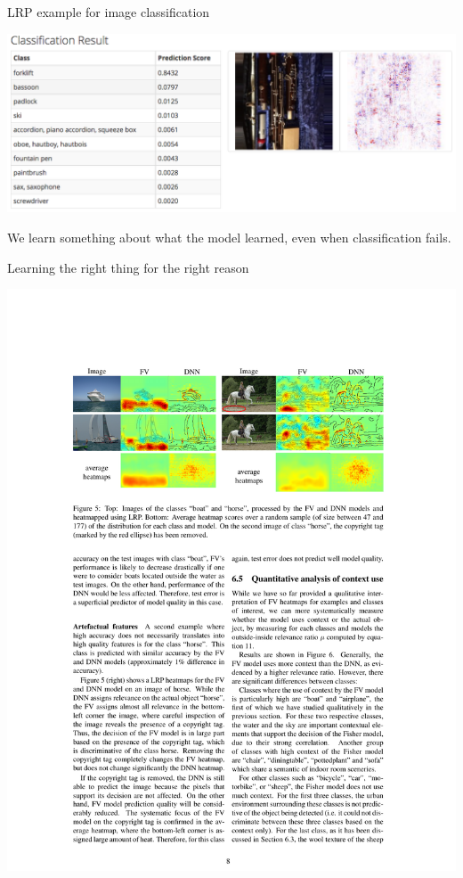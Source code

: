 \documentclass[compress]{beamer}
\begin{document}
\begin{frame}{LRP example for image classification}
  \begin{center}
    \includegraphics[width=1.00\textwidth]{./figures/lrp_example_3.png}
  \end{center}
  We learn something about what the model learned, even when classification fails.
\end{frame}

\begin{frame}{Learning the right thing for the right reason}
  \begin{center}
    \includegraphics[width=1.00\textwidth]{./figures/fv_vs_dnn.pdf}
  \end{center}
\end{frame}
\end{document}
